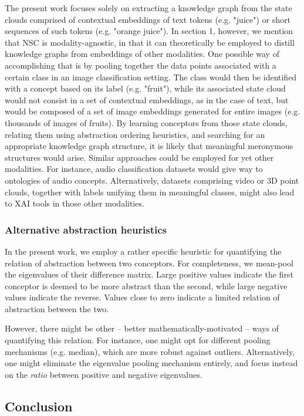 The present work focuses solely on extracting a knowledge graph from the state clouds comprised of contextual embeddings of text tokens (e.g. "juice") or short sequences of such tokens (e.g. "orange juice"). In section 1, however, we mention that NSC is modality-agnostic, in that it can theoretically be employed to distill knowledge graphs from embeddings of other modalities. One possible way of accomplishing that is by pooling together the data points associated with a certain class in an image classification setting. The class would then be identified with a concept based on its label (e.g. "fruit"), while its associated state cloud would not consist in a set of contextual embeddings, as in the case of text, but would be composed of a set of image embeddings generated for entire images (e.g. thousands of images of fruits). By learning conceptors from those state clouds, relating them using abstraction ordering heuristics, and searching for an appropriate knowledge graph structure, it is likely that meaningful meronymous structures would arise. Similar approaches could be employed for yet other modalities. For instance, audio classification datasets would give way to ontologies of audio concepts. Alternatively, datasets comprising video or 3D point clouds, together with labels unifying them in meaningful classes, might also lead to XAI tools in those other modalities.

\subsubsection{Alternative abstraction heuristics}

In the present work, we employ a rather specific heuristic for quantifying the relation of abstraction between two conceptors. For completeness, we mean-pool the eigenvalues of their difference matrix. Large positive values indicate the first conceptor is deemed to be more abstract than the second, while large negative values indicate the reverse. Values close to zero indicate a limited relation of abstraction between the two.

However, there might be other -- better mathematically-motivated -- ways of quantifying this relation. For instance, one might opt for different pooling mechanisms (e.g. median), which are more robust against outliers. Alternatively, one might eliminate the eigenvalue pooling mechanism entirely, and focus instead on the \textit{ratio} between positive and negative eigenvalues.

\subsection{Conclusion}

